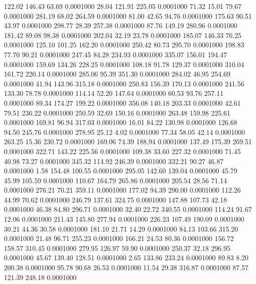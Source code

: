  122.02  146.43   63.69   0.0001000
  28.04  121.91  225.05   0.0001000
  71.32   15.01   79.67   0.0001000
 281.19   68.02  264.59   0.0001000
  81.00   42.65   94.76   0.0001000
 175.63   90.51   43.97   0.0001000
 298.77   28.39  257.38   0.0001000
  87.76  149.19  280.96   0.0001000
 181.42   89.08   98.38   0.0001000
 202.04   32.19   23.78   0.0001000
 185.07  146.33   76.25   0.0001000
 125.10  101.25  162.20   0.0001000
 250.42   80.73  295.70   0.0001000
 198.83   77.70   90.21   0.0001000
 247.45   84.28  234.93   0.0001000
 335.07  156.01  194.47   0.0001000
 159.69  134.26  228.25   0.0001000
 108.18   91.78  129.37   0.0001000
 310.04  161.72  220.14   0.0001000
 285.06   95.39  351.30   0.0001000
 284.02   46.95  254.69   0.0001000
  41.94  143.96  315.18   0.0001000
 250.83  156.39  170.13   0.0001000
 241.56  133.30   78.78   0.0001000
 114.14   52.20  147.64   0.0001000
  60.53   93.76  257.11   0.0001000
  89.34  174.27  199.22   0.0001000
 356.08  140.18  203.33   0.0001000
  42.61   79.51  236.22   0.0001000
 250.59   32.69  150.16   0.0001000
 263.48  159.98  225.61   0.0001000
 169.81   96.94  317.03   0.0001000
  16.01   84.22  130.98   0.0001000
 126.68   94.50  245.76   0.0001000
 278.95   25.12    4.02   0.0001000
  77.34   58.05   42.14   0.0001000
 263.25   15.36  230.72   0.0001000
 169.06   74.39  188.94   0.0001000
 137.49  175.39  269.51   0.0001000
 322.71  143.22  225.56   0.0001000
 109.38   33.60  227.32   0.0001000
  71.45   40.98   73.27   0.0001000
 345.32  114.92  246.39   0.0001000
 332.21   90.27   46.87   0.0001000
   1.58  154.48  100.55   0.0001000
 295.05  142.60  139.04   0.0001000
  45.79   45.99  105.59   0.0001000
 110.67  164.79  265.86   0.0001000
 205.54   28.56   71.14   0.0001000
 276.21   70.21  359.11   0.0001000
 177.02   94.39  290.00   0.0001000
 112.26   44.99   70.62   0.0001000
 246.79  137.61  324.75   0.0001000
 147.88  107.73   42.18   0.0001000
  46.38   84.80  296.71   0.0001000
  32.40   22.72  340.55   0.0001000
 114.24   91.67   12.06   0.0001000
 211.43  145.80  277.94   0.0001000
 226.23  107.49  190.09   0.0001000
  30.21   44.36   30.58   0.0001000
 181.10   21.71   14.29   0.0001000
  84.13  103.66  315.20   0.0001000
  21.48   96.71  255.23   0.0001000
 166.21   24.53   80.36   0.0001000
 156.72  158.57  310.45   0.0001000
 279.95  126.97   59.90   0.0001000
 250.37   32.18  296.95   0.0001000
  45.67  139.40  128.51   0.0001000
   2.65  133.86  233.24   0.0001000
  89.83    8.20  200.38   0.0001000
  95.78   90.68   26.53   0.0001000
  11.54   29.38  316.87   0.0001000
  87.57  121.39  248.18   0.0001000
